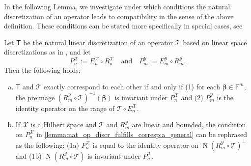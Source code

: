 \documentclass[a4paper]{paper}
\newcommand{\VecSpace}[1]{\mathscr{#1}}
\newcommand{\Field}{\mathbb{F}}
\newcommand{\Op}[1]{\mathcal{#1}}
\newcommand{\DiscOp}[1]{\mathsf{#1}}
\newcommand*{\EXT}[2]{\ensuremath{E_{#1}^{#2}}}
\newcommand*{\REST}[2]{\ensuremath{R_{#1}^{#2}}}
\newcommand*{\PROJ}[2]{\ensuremath{P_{#1}^{#2}}}
\newcommand*{\RnX}{\ensuremath{\REST{n}{\VecSpace{X}}}}
\newcommand*{\RmY}{\ensuremath{\REST{m}{\VecSpace{Y}}}}
\newcommand*{\EnX}{\ensuremath{\EXT{n}{\VecSpace{X}}}}
\newcommand*{\EmY}{\ensuremath{\EXT{m}{\VecSpace{Y}}}}
\newcommand*{\PnX}{\ensuremath{\PROJ{n}{\VecSpace{X}}}}
\newcommand*{\PmY}{\ensuremath{\PROJ{m}{\VecSpace{Y}}}}
\DeclareMathOperator{\nullspace}{N}
\newcommand{\vbeta}{\boldsymbol{\beta}}
\begin{document}
In the following Lemma, we investigate under which conditions the natural discretization of an operator leads to compatibility in the sense 
of the above definition. These conditions can be stated more specifically in special cases, see 

\begin{lemma}
 \label{lemma:nat_op_discr_fulfills_corresp}
 Let $\DiscOp{T}$ be the natural linear discretization of an operator $\Op{T}$ based on linear space discretizations as in 
 , and let
 \begin{equation*}
  \PnX := \EnX \circ \RnX \quad \text{and} \quad \PmY := \EmY \circ \RmY.
 \end{equation*}
 Then the following holds:
 
 \begin{enumerate}[(a)]
  \item \label{lemma:nat_op_discr_fulfills_corresp:a_general}
  $\DiscOp{T}$ and $\Op{T}$ exactly correspond to each other if and only if (1) for each $\vbeta \in \Field^m$, the preimage 
  $(\RmY \circ \Op{T})^{-1}({\vbeta})$ is invariant under $\PnX$ and (2) $\PmY$ is the identity operator on the range of 
  $\Op{T} \circ \EnX$.

  \item \label{lemma:nat_op_discr_fulfills_corresp:b_hilbert_linear}
  If $\VecSpace{X}$ is a Hilbert space and $\Op{T}$ and $\RmY$ are linear and bounded, the condition on $\PnX$ in 
  \eqref{lemma:nat_op_discr_fulfills_corresp:a_general} can be rephrased as the following: (1a) $\PnX$ is equal to the identity operator on 
  $\nullspace(\RmY \circ \Op{T})^\perp$ and (1b) $\nullspace(\RmY \circ \Op{T})$ is invariant under $\PnX$.
  
 \end{enumerate}
\end{lemma}
\end{document}
